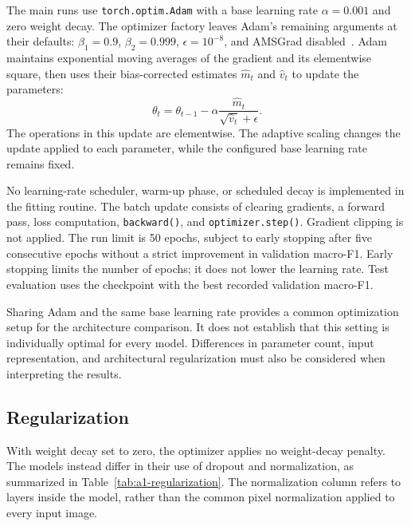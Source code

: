 The main runs use \texttt{torch.optim.Adam} with a base learning rate $\alpha=0.001$ and zero weight decay. The optimizer factory leaves Adam's remaining arguments at their defaults: $\beta_1=0.9$, $\beta_2=0.999$, $\epsilon=10^{-8}$, and AMSGrad disabled~\cite{pytorch-adam}. Adam maintains exponential moving averages of the gradient and its elementwise square, then uses their bias-corrected estimates $\widehat{m}_t$ and $\widehat{v}_t$ to update the parameters:
\begin{equation}
    \theta_t=\theta_{t-1}
    -\alpha\frac{\widehat{m}_t}{\sqrt{\widehat{v}_t}+\epsilon}.
\end{equation}
The operations in this update are elementwise. The adaptive scaling changes the update applied to each parameter, while the configured base learning rate remains fixed.

No learning-rate scheduler, warm-up phase, or scheduled decay is implemented in the fitting routine. The batch update consists of clearing gradients, a forward pass, loss computation, \texttt{backward()}, and \texttt{optimizer.step()}. Gradient clipping is not applied. The run limit is 50 epochs, subject to early stopping after five consecutive epochs without a strict improvement in validation macro-F1. Early stopping limits the number of epochs; it does not lower the learning rate. Test evaluation uses the checkpoint with the best recorded validation macro-F1.

Sharing Adam and the same base learning rate provides a common optimization setup for the architecture comparison. It does not establish that this setting is individually optimal for every model. Differences in parameter count, input representation, and architectural regularization must also be considered when interpreting the results.

\subsection{Regularization}

With weight decay set to zero, the optimizer applies no weight-decay penalty. The models instead differ in their use of dropout and normalization, as summarized in Table~\ref{tab:a1-regularization}. The normalization column refers to layers inside the model, rather than the common pixel normalization applied to every input image.

